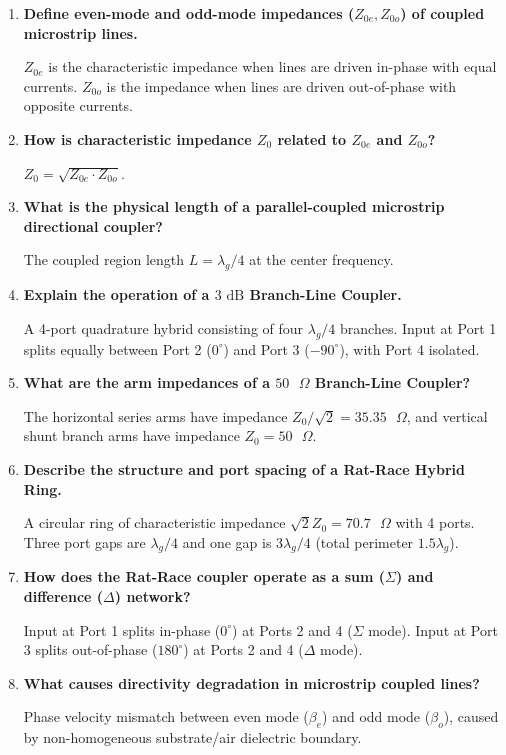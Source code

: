 \documentclass[12pt,a4paper]{article}
\newcommand{\Q}[1]{\textbf{#1}\par\noindent\ignorespaces}
\begin{document}
\begin{tcolorbox}[exambox, title={\textbf{Frequently Asked / Viva Questions}}]
  \begin{enumerate}[topsep=0pt, label=\textbf{Q\arabic*.}, itemsep=5pt]
    \item \Q{Define even-mode and odd-mode impedances ($Z_{0e}, Z_{0o}$) of coupled microstrip lines.}
    $Z_{0e}$ is the characteristic impedance when lines are driven in-phase with equal currents. $Z_{0o}$ is the impedance when lines are driven out-of-phase with opposite currents.

    \item \Q{How is characteristic impedance $Z_0$ related to $Z_{0e}$ and $Z_{0o}$?}
    $Z_0 = \sqrt{Z_{0e} \cdot Z_{0o}}$.

    \item \Q{What is the physical length of a parallel-coupled microstrip directional coupler?}
    The coupled region length $L = \lambda_g/4$ at the center frequency.

    \item \Q{Explain the operation of a $3\text{ dB}$ Branch-Line Coupler.}
    A 4-port quadrature hybrid consisting of four $\lambda_g/4$ branches. Input at Port 1 splits equally between Port 2 ($0^\circ$) and Port 3 ($-90^\circ$), with Port 4 isolated.

    \item \Q{What are the arm impedances of a $50\text{ }\Omega$ Branch-Line Coupler?}
    The horizontal series arms have impedance $Z_0/\sqrt{2} = 35.35\text{ }\Omega$, and vertical shunt branch arms have impedance $Z_0 = 50\text{ }\Omega$.

    \item \Q{Describe the structure and port spacing of a Rat-Race Hybrid Ring.}
    A circular ring of characteristic impedance $\sqrt{2}Z_0 = 70.7\text{ }\Omega$ with 4 ports. Three port gaps are $\lambda_g/4$ and one gap is $3\lambda_g/4$ (total perimeter $1.5\lambda_g$).

    \item \Q{How does the Rat-Race coupler operate as a sum ($\Sigma$) and difference ($\Delta$) network?}
    Input at Port 1 splits in-phase ($0^\circ$) at Ports 2 and 4 ($\Sigma$ mode). Input at Port 3 splits out-of-phase ($180^\circ$) at Ports 2 and 4 ($\Delta$ mode).

    \item \Q{What causes directivity degradation in microstrip coupled lines?}
    Phase velocity mismatch between even mode ($\beta_e$) and odd mode ($\beta_o$), caused by non-homogeneous substrate/air dielectric boundary.


\end{enumerate}
\end{tcolorbox}
\end{document}
